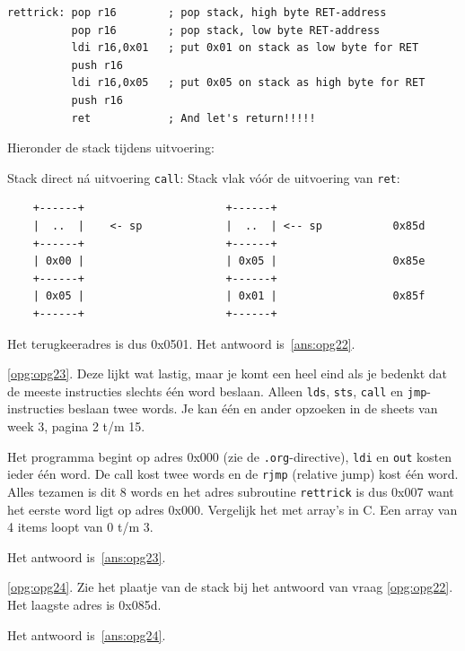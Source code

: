 \documentclass[a4paper,12pt,fleqn,dutch]{tisdexam}
\begin{document}
\begin{questions}
\begin{verbatim}
rettrick: pop r16        ; pop stack, high byte RET-address
          pop r16        ; pop stack, low byte RET-address
          ldi r16,0x01   ; put 0x01 on stack as low byte for RET
          push r16 
          ldi r16,0x05   ; put 0x05 on stack as high byte for RET
          push r16 
          ret            ; And let's return!!!!!
\end{verbatim}

\newpage
Hieronder de stack tijdens uitvoering:

Stack direct n\'{a} uitvoering \texttt{call}: \hspace{20pt} Stack vlak
v\'{o}\'{o}r de uitvoering van \texttt{ret}:

\begin{verbatim}
    +------+                      +------+
    |  ..  |    <- sp             |  ..  | <-- sp           0x85d
    +------+                      +------+
    | 0x00 |                      | 0x05 |                  0x85e
    +------+                      +------+
    | 0x05 |                      | 0x01 |                  0x85f
    +------+                      +------+
\end{verbatim}

Het terugkeeradres is dus 0x0501. Het antwoord is~\ref{ans:opg22}.

\vspace{1em}
\ref{opg:opg23}. Deze lijkt wat lastig, maar je komt een heel eind als je
bedenkt dat de meeste instructies slechts \'{e}\'{e}n word beslaan. Alleen
\texttt{lds}, \texttt{sts}, \texttt{call} en \texttt{jmp}-instructies
beslaan twee words. Je kan \'{e}\'{e}n en ander opzoeken in de sheets van
week 3, pagina 2 t/m 15.

Het programma begint op adres 0x000 (zie de \texttt{.org}-directive),
\texttt{ldi} en \texttt{out} kosten ieder \'{e}\'{e}n word. De call kost twee
words en de \texttt{rjmp} (relative jump) kost \'{e}\'{e}n word. Alles tezamen
is dit 8 words en het adres subroutine \texttt{rettrick} is dus 0x007 want het
eerste word ligt op adres 0x000. Vergelijk het met array's in C. Een array van
4 items loopt van 0 t/m 3.

Het antwoord is~\ref{ans:opg23}.

\vspace{1em}
\ref{opg:opg24}. Zie het plaatje van de stack bij het antwoord van vraag
\ref{opg:opg22}.
Het laagste adres is 0x085d.

Het antwoord is~\ref{ans:opg24}.



\end{questions}
\end{document}
